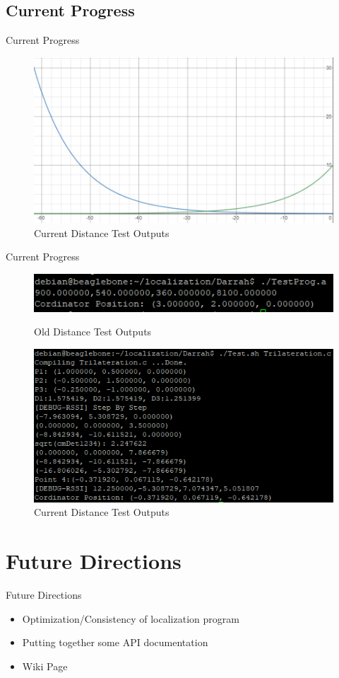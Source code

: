 \documentclass{beamer}
\begin{document}
\subsection{Current Progress}
\begin{frame}{Current Progress}
    \begin{figure}
    \centering
    \includegraphics[scale=0.45]{figs/ScreenShots/GraphRepofRSSI.PNG}
    \caption{Current Distance Test Outputs}
    \label{fig:RSSIOutputTable_Paper}
    \end{figure}
\end{frame}

\begin{frame}{Current Progress}    
	\begin{figure}
    \centering
    \includegraphics[scale=0.7]{figs/ScreenShots/LocalizationTestOutput.PNG}
    \caption{Old Distance Test Outputs}
    \label{fig:RSSIOutputTable_Paper}
	
    \centering
    \includegraphics[scale=0.7]{figs/ScreenShots/PositionOutput.PNG}
    \caption{Current Distance Test Outputs}
    \label{fig:RSSIOutputTable_Paper}
    \end{figure}
\end{frame}


\section{Future Directions}

\begin{frame}{Future Directions}{}
    \begin{itemize}
        \item Optimization/Consistency of localization program
        \item Putting together some API documentation
        \item Wiki Page
    \end{itemize}
\end{frame}
\end{document}
